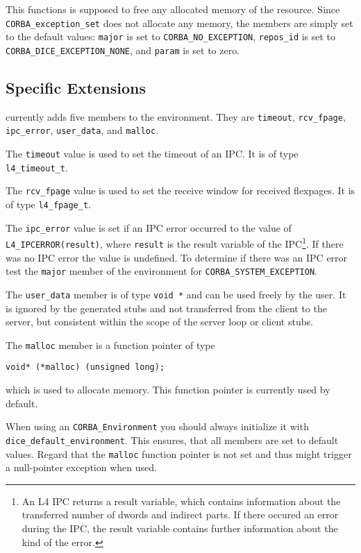 This functions is supposed to free any allocated memory of
the resource. Since \verb|CORBA_exception_set| does not
allocate any memory, the members are simply set to the default
values: \verb|major| is set to \verb|CORBA_NO_EXCEPTION|,
\verb|repos_id| is set to \verb|CORBA_DICE_EXCEPTION_NONE|,
and \verb|param| is set to zero.

\subsection{\dice{} Specific Extensions}
\label{sec:env-dice}

\dice{} currently adds five members to the environment.
They are \verb|timeout|, \verb|rcv_fpage|, \verb|ipc_error|,
\verb|user_data|, and \verb|malloc|.

The \verb|timeout| value is used to set the timeout
of an IPC. It is of type \verb|l4_timeout_t|.

The \verb|rcv_fpage| value is used to set the receive
window for received flexpages. It is of type
\verb|l4_fpage_t|.

The \verb|ipc_error| value is set if an IPC error
occurred to the value of \verb|L4_IPCERROR(result)|,
where \verb|result| is the result variable of the
IPC\footnote{An L4 IPC returns a result variable,
which contains information about the transferred number
of dwords and indirect parts. If there occured an
error during the IPC, the result variable contains
further information about the kind of the error.}. 
If there was no IPC error the value is undefined.
To determine if there was an IPC error test the
\verb|major| member of the environment for
\verb|CORBA_SYSTEM_EXCEPTION|.

The \verb|user_data| member is of type \verb|void *| and
can be used freely by the user. It is ignored by the generated
stubs and not transferred from the client to the server,
but consistent within the scope of the server loop or
client stubs.

The \verb|malloc| member is a function pointer of type
\begin{verbatim}
void* (*malloc) (unsigned long);
\end{verbatim}
which is used to allocate memory. This function pointer
is currently used by default.

When using an \verb|CORBA_Environment| you should always
initialize it with \verb|dice_default_environment|. This
ensures, that all members are set to default values.
Regard that the \verb|malloc| function pointer is not
set and thus might trigger a null-pointer exception when
used.

